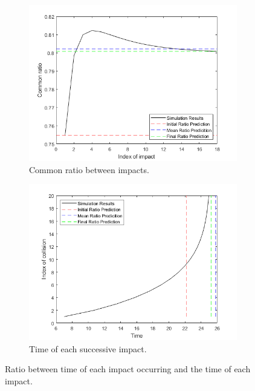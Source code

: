 \begin{figure}[ht]
    \centering
    \begin{subfigure}{0.49\textwidth}
    \includegraphics[width=\textwidth]{Figures/ImpactSeries/CommonRatio.png}
    \caption{Common ratio between impacts.}
    \label{fig: ImpactOtherRatio}
    \end{subfigure}
    \begin{subfigure}{0.49\textwidth}
    \includegraphics[width=\textwidth]{Figures/ImpactSeries/FinalTime.png}
    \caption{Time of each successive impact.}
    \label{fig: ImpactOtherTimes}
    \end{subfigure}
    \caption{Ratio between time of each impact occurring and the time of each impact.}
    \label{fig: ImpactOther}
\end{figure}

